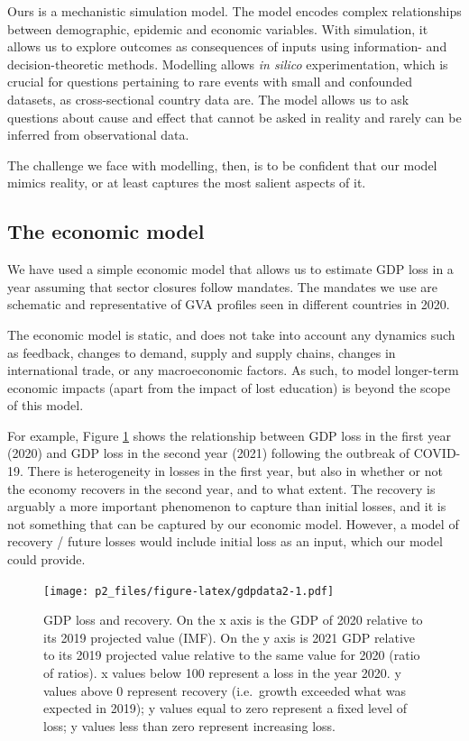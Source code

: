 \documentclass[
]{article}
\begin{document}
Ours is a mechanistic simulation model. The model encodes complex relationships between demographic, epidemic and economic variables. With simulation, it allows us to explore outcomes as consequences of inputs using information- and decision-theoretic methods. Modelling allows \emph{in silico} experimentation, which is crucial for questions pertaining to rare events with small and confounded datasets, as cross-sectional country data are. The model allows us to ask questions about cause and effect that cannot be asked in reality and rarely can be inferred from observational data.

The challenge we face with modelling, then, is to be confident that our model mimics reality, or at least captures the most salient aspects of it.

\hypertarget{the-economic-model}{%
\subsection{The economic model}\label{the-economic-model}}

We have used a simple economic model that allows us to estimate GDP loss in a year assuming that sector closures follow mandates. The mandates we use are schematic and representative of GVA profiles seen in different countries in 2020.

The economic model is static, and does not take into account any dynamics such as feedback, changes to demand, supply and supply chains, changes in international trade, or any macroeconomic factors. As such, to model longer-term economic impacts (apart from the impact of lost education) is beyond the scope of this model.

For example, Figure \ref{fig:gdpdata2} shows the relationship between GDP loss in the first year (2020) and GDP loss in the second year (2021) following the outbreak of COVID-19. There is heterogeneity in losses in the first year, but also in whether or not the economy recovers in the second year, and to what extent. The recovery is arguably a more important phenomenon to capture than initial losses, and it is not something that can be captured by our economic model. However, a model of recovery / future losses would include initial loss as an input, which our model could provide.

\begin{figure}
\centering
\texttt{[image: p2\_files/figure-latex/gdpdata2-1.pdf]}
\caption{\label{fig:gdpdata2}GDP loss and recovery. On the x axis is the GDP of 2020 relative to its 2019 projected value (IMF). On the y axis is 2021 GDP relative to its 2019 projected value relative to the same value for 2020 (ratio of ratios). x values below 100 represent a loss in the year 2020. y values above 0 represent recovery (i.e.~growth exceeded what was expected in 2019); y values equal to zero represent a fixed level of loss; y values less than zero represent increasing loss.}
\end{figure}
\end{document}
